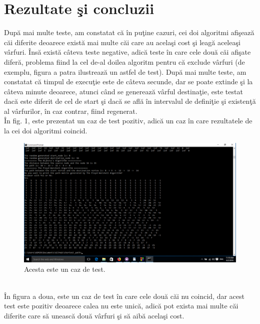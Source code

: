 \documentclass{article}
\begin{document}
\section{Rezultate \c{s}i concluzii}
Dup\u{a} mai multe teste, am constatat c\u{a} \^{i}n pu\c{t}ine cazuri, cei doi algoritmi afi\c{s}eaz\u{a} c\u{a}i diferite deoarece exist\u{a} mai multe c\u{a}i care au acela\c{s}i cost \c{s}i leag\u{a} acelea\c{s}i v\^{a}rfuri. \^{I}ns\u{a} exist\u{a} c\^{a}teva teste negative, adic\u{a} teste \^{i}n care cele dou\u{a} c\u{a}i afi\c{s}ate difer\u{a}, problema fiind la cel de-al doilea algoritm pentru c\u{a} exclude v\^{a}rfuri (de exemplu, figura a patra ilustreaz\u{a} un astfel de test). Dup\u{a} mai multe teste, am constatat c\u{a} timpul de execu\c{t}ie este de c\^{a}teva secunde, dar se poate extinde \c{s}i la c\^{a}teva minute deoarece, atunci c\^{a}nd se genereaz\u{a} v\^{a}rful destina\c{t}ie, este testat dac\u{a} este diferit de cel de start \c{s}i dac\u{a} se afl\u{a} \^{i}n intervalul de defini\c{t}ie \c{s}i existen\c{t}\u{a} al v\^{a}rfurilor, \^{i}n caz contrar, fiind regenerat.\\
\^{I}n fig. 1, este prezentat un caz de test pozitiv, adic\u{a} un caz \^{i}n care rezultatele de la cei doi algoritmi coincid.\\
\begin{figure}[htp]
\centering
\includegraphics[width=12cm]{Test.png}
\caption{Acesta este un caz de test.}
\label{fig:1}
\end{figure}
\\
\^{I}n figura a doua, este un caz de test \^{i}n care cele dou\u{a} c\u{a}i nu coincid, dar acest test este pozitiv deoarece calea nu este unic\u{a}, adic\u{a} pot exista mai multe c\u{a}i diferite care s\u{a} uneasc\u{a} dou\u{a} v\^{a}rfuri \c{s}i s\u{a} aib\u{a} acela\c{s}i cost.\\
\end{document}
